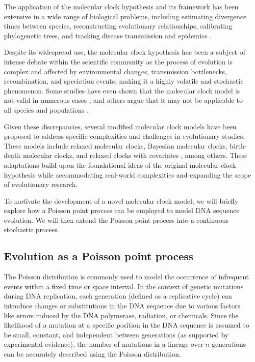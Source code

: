 \documentclass{./LatexTemplate/svproc}
\begin{document}
The application of the molecular clock hypothesis and its framework has been extensive in a wide range of biological problems, including estimating divergence times between species, reconstructing evolutionary relationships, calibrating phylogenetic trees, and tracking disease transmission and epidemics \cite{Ho2008,Ho2014,park2016}.

Despite its widespread use, the molecular clock hypothesis has been a subject of intense debate within the scientific community as the process of evolution is complex and affected by environmental changes, transmission bottlenecks, recombination, and speciation events, making it a highly volatile and stochastic phenomenon. Some studies have even shown that the molecular clock model is not valid in numerous cases \cite{jenkins2002}, and others argue that it may not be applicable to all species and populations \cite{langley1974,bedford2008}.

Given these discrepancies, several modified molecular clock models have been proposed to address specific complexities and challenges in evolutionary studies. These models include relaxed molecular clocks, Bayesian molecular clocks, birth-death molecular clocks, and relaxed clocks with covariates \cite{ayala1999,kumar2005}, among others. These adaptations build upon the foundational ideas of the original molecular clock hypothesis while accommodating real-world complexities and expanding the scope of evolutionary research.

To motivate the development of a novel molecular clock model, we will briefly explore how a Poisson point process can be employed to model DNA sequence evolution. We will then extend the Poisson point process into a continuous stochastic process.

%
\subsection{Evolution as a Poisson point process}
%

The Poisson distribution is commonly used to model the occurrence of infrequent events within a fixed time or space interval. In the context of genetic mutations during DNA replication, each generation (defined as a replicative cycle) can introduce changes or substitutions in the DNA sequence due to various factors like errors induced by the DNA polymerase, radiation, or chemicals. Since the likelihood of a mutation at a specific position in the DNA sequence is assumed to be small, constant, and independent between generations (as supported by experimental evidence), the number of mutations in a lineage over $n$ generations can be accurately described using the Poisson distribution.
\end{document}
